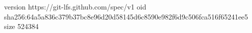 version https://git-lfs.github.com/spec/v1
oid sha256:64a5a836c379b37bc8e96d20d58145d6c8590e982f6d9c506fca516f65241ee5
size 524384
